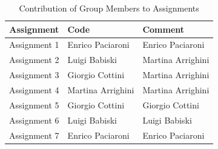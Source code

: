 \documentclass[12pt, openright, oneside]{report}
\begin{document}
\begin{table}[htbp]
    \centering
    \renewcommand{\arraystretch}{1.2} %
    \begin{tabular}{|c|l|l|}
        \hline
        \rowcolor{unired!40} \textbf{Assignment} & \textbf{Code}              & \textbf{Comment}         \\ \hline
        Assignment 1        & Enrico Paciaroni          & Enrico Paciaroni         \\ \hline
        \rowcolor{gray!10} Assignment 2        & Luigi Babiski             & Martina Arrighini        \\ \hline
        Assignment 3        & Giorgio Cottini           & Martina Arrighini        \\ \hline
        \rowcolor{gray!10} Assignment 4        & Martina Arrighini         & Martina Arrighini        \\ \hline
        Assignment 5        & Giorgio Cottini           & Giorgio Cottini          \\ \hline
        \rowcolor{gray!10} Assignment 6        & Luigi Babiski             & Luigi Babiski            \\ \hline
        Assignment 7        & Enrico Paciaroni          & Enrico Paciaroni         \\ \hline
    \end{tabular}
    \caption{Contribution of Group Members to Assignments}
    \label{tab:group_contribution}
\end{table}

\end{document}
